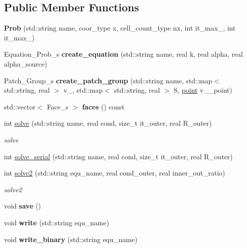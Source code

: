 \subsection*{Public Member Functions}
\begin{DoxyCompactItemize}
\item 
\hypertarget{classProb_a4d146873812b11594835eeb221057ce3}{{\bfseries Prob} (std\+::string name, coor\+\_\+type x, cell\+\_\+count\+\_\+type nx, int it\+\_\+max\+\_, int it\+\_\+max\+\_)}\label{classProb_a4d146873812b11594835eeb221057ce3}

\item 
\hypertarget{classProb_a9e42af858cc616a84ffa860ed30703cc}{Equation\+\_\+\+Prob\+\_\+s {\bfseries create\+\_\+equation} (std\+::string name, real k, real alpha, real alpha\+\_\+source)}\label{classProb_a9e42af858cc616a84ffa860ed30703cc}

\item 
\hypertarget{classProb_abb05f9a8629633d7509ec035128c3012}{Patch\+\_\+\+Group\+\_\+s {\bfseries create\+\_\+patch\+\_\+group} (std\+::string name, std\+::map$<$ std\+::string, real $>$ v\+\_, std\+::map$<$ std\+::string, real $>$ S, \hyperlink{structpoint}{point} v\+\_\+\_\+point)}\label{classProb_abb05f9a8629633d7509ec035128c3012}

\item 
\hypertarget{classProb_a30084f3c079cf517bdffdad065eee5dc}{std\+::vector$<$ Face\+\_\+s $>$ {\bfseries faces} () const }\label{classProb_a30084f3c079cf517bdffdad065eee5dc}

\item 
int \hyperlink{classProb_ad4de9e5a4bf13c03e2ba243b884b75d7}{solve} (std\+::string name, real cond, size\+\_\+t it\+\_\+outer, real R\+\_\+outer)
\begin{DoxyCompactList}\small\item\em solve \end{DoxyCompactList}\item 
int \hyperlink{classProb_ad16bc67a7a966dd5b6ba38afbe85a860}{solve\+\_\+serial} (std\+::string name, real cond, size\+\_\+t it\+\_\+outer, real R\+\_\+outer)
\item 
int \hyperlink{classProb_a3d2e422acfd8bf712d7fca87c5bc04ca}{solve2} (std\+::string equ\+\_\+name, real cond\+\_\+outer, real inner\+\_\+out\+\_\+ratio)
\begin{DoxyCompactList}\small\item\em solve2 \end{DoxyCompactList}\item 
\hypertarget{classProb_a187e846a4f4eed21758efaa63ede9ec1}{void {\bfseries save} ()}\label{classProb_a187e846a4f4eed21758efaa63ede9ec1}

\item 
\hypertarget{classProb_ad790058d97221b21c665d550650c15ad}{void {\bfseries write} (std\+::string equ\+\_\+name)}\label{classProb_ad790058d97221b21c665d550650c15ad}

\item 
\hypertarget{classProb_a06e9e4b07d84c253b313b6d490776353}{void {\bfseries write\+\_\+binary} (std\+::string equ\+\_\+name)}\label{classProb_a06e9e4b07d84c253b313b6d490776353}

\end{DoxyCompactItemize}
